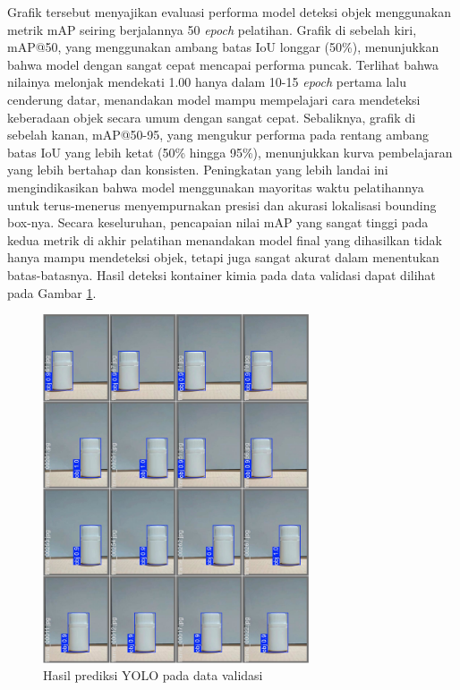 Grafik tersebut menyajikan evaluasi performa model deteksi objek
menggunakan metrik mAP seiring berjalannya
50 \textit{epoch} pelatihan. Grafik di sebelah kiri, mAP@50, yang menggunakan
ambang batas IoU longgar (50\%), menunjukkan bahwa model dengan
sangat cepat mencapai performa puncak. Terlihat bahwa nilainya
melonjak mendekati 1.00 hanya dalam 10-15 \textit{epoch} pertama lalu
cenderung datar, menandakan model mampu mempelajari cara mendeteksi
keberadaan objek secara umum dengan sangat cepat. Sebaliknya, grafik
di sebelah kanan, mAP@50-95, yang mengukur performa pada rentang
ambang batas IoU yang lebih ketat (50\% hingga 95\%), menunjukkan
kurva pembelajaran yang lebih bertahap dan konsisten. Peningkatan
yang lebih landai ini mengindikasikan bahwa model menggunakan
mayoritas waktu pelatihannya untuk terus-menerus menyempurnakan
presisi dan akurasi lokalisasi bounding box-nya. Secara keseluruhan,
pencapaian nilai mAP yang sangat tinggi pada kedua metrik di akhir
pelatihan menandakan model final yang dihasilkan tidak hanya mampu
mendeteksi objek, tetapi juga sangat akurat dalam menentukan
batas-batasnya. Hasil deteksi kontainer kimia pada data validasi
dapat dilihat pada Gambar \ref{fig:yolo-validasi}.

\begin{figure}[H]
  \centering
  \includegraphics[width=0.7\textwidth]{gambar/yolo_validasi.jpg}
  \caption{Hasil prediksi YOLO pada data validasi}
  \label{fig:yolo-validasi}
\end{figure}
\vspace{-1em}

